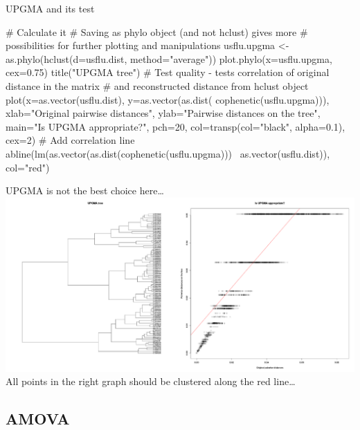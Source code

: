 \documentclass[compress, ucs, xelatex, 11pt, xcolor=svgnames,
	hyperref={
		bookmarks=true,
		unicode=true,
		colorlinks=true,
		pdftitle={Molecular data in R},
		plainpages=false,
		pdfauthor={Vojtech Zeisek},
		pdfsubject={Course about phylogeny and evolution in R},
		pdfcreator={XeLaTeX},
		pdfkeywords={R, evolution, phylogeny, molecular data},
		linkcolor=Tomato,
		anchorcolor=SaddleBrown,
		citecolor=Goldenrod,
		filecolor=DarkMagenta,
		menucolor=Sienna,
		urlcolor=DarkTurquoise,
		pdftex},
	url={hyphens, lowtilde} %
	]{beamer}
\begin{document}
\begin{frame}[fragile]{UPGMA and its test}
	\begin{spluscode}
    # Calculate it
    # Saving as phylo object (and not hclust) gives more
    # possibilities for further plotting and manipulations
    usflu.upgma <- as.phylo(hclust(d=usflu.dist, method="average"))
    plot.phylo(x=usflu.upgma, cex=0.75)
    title("UPGMA tree")
    # Test quality - tests correlation of original distance in the matrix
    # and reconstructed distance from hclust object
    plot(x=as.vector(usflu.dist), y=as.vector(as.dist(
      cophenetic(usflu.upgma))), xlab="Original pairwise distances",
      ylab="Pairwise distances on the tree", main="Is UPGMA
      appropriate?", pch=20, col=transp(col="black",
      alpha=0.1), cex=2)
    # Add correlation line
    abline(lm(as.vector(as.dist(cophenetic(usflu.upgma)))~
      as.vector(usflu.dist)), col="red")
	\end{spluscode}
\end{frame}

\begin{frame}{UPGMA is not the best choice here\ldots}
	\includegraphics[width=\textwidth]{upgma.png}
	\vfil
	All points in the right graph should be clustered along the red line\ldots
	\vfill
\end{frame}

\subsection{AMOVA}
\end{document}
